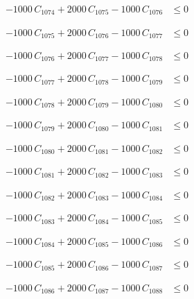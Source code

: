 \documentclass[a4paper,11pt]{article}
\begin{document}
\begin{align}
-1000\,C_{1074} + 2000\,C_{1075} - 1000\,C_{1076} &\leq 0 \nonumber
\end{align}

\begin{align}
-1000\,C_{1075} + 2000\,C_{1076} - 1000\,C_{1077} &\leq 0 \nonumber
\end{align}

\begin{align}
-1000\,C_{1076} + 2000\,C_{1077} - 1000\,C_{1078} &\leq 0 \nonumber
\end{align}

\begin{align}
-1000\,C_{1077} + 2000\,C_{1078} - 1000\,C_{1079} &\leq 0 \nonumber
\end{align}

\begin{align}
-1000\,C_{1078} + 2000\,C_{1079} - 1000\,C_{1080} &\leq 0 \nonumber
\end{align}

\begin{align}
-1000\,C_{1079} + 2000\,C_{1080} - 1000\,C_{1081} &\leq 0 \nonumber
\end{align}

\begin{align}
-1000\,C_{1080} + 2000\,C_{1081} - 1000\,C_{1082} &\leq 0 \nonumber
\end{align}

\begin{align}
-1000\,C_{1081} + 2000\,C_{1082} - 1000\,C_{1083} &\leq 0 \nonumber
\end{align}

\begin{align}
-1000\,C_{1082} + 2000\,C_{1083} - 1000\,C_{1084} &\leq 0 \nonumber
\end{align}

\begin{align}
-1000\,C_{1083} + 2000\,C_{1084} - 1000\,C_{1085} &\leq 0 \nonumber
\end{align}

\begin{align}
-1000\,C_{1084} + 2000\,C_{1085} - 1000\,C_{1086} &\leq 0 \nonumber
\end{align}

\begin{align}
-1000\,C_{1085} + 2000\,C_{1086} - 1000\,C_{1087} &\leq 0 \nonumber
\end{align}

\begin{align}
-1000\,C_{1086} + 2000\,C_{1087} - 1000\,C_{1088} &\leq 0 \nonumber
\end{align}
\end{document}
